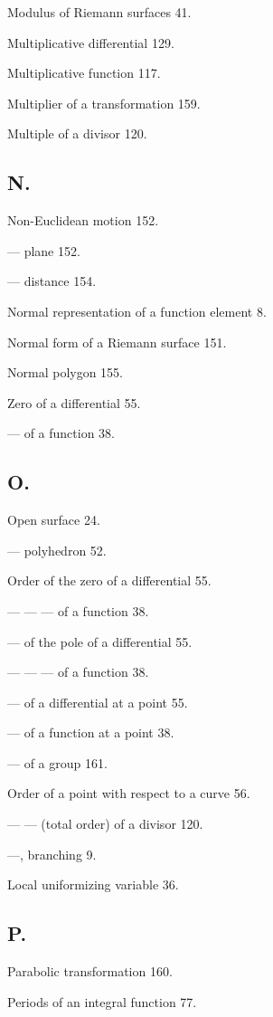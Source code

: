 \documentclass{article}
\begin{document}
Modulus of Riemann surfaces 41.

Multiplicative differential 129.

Multiplicative function 117.

Multiplier of a transformation 159.

Multiple of a divisor 120.

\subsection*{N.}

Non-Euclidean motion 152.

--- plane 152.

--- distance 154.

Normal representation of a function element 8.

Normal form of a Riemann surface 151.

Normal polygon 155.

Zero of a differential 55.

--- of a function 38.

\subsection*{O.}

Open surface 24.

--- polyhedron 52.

Order of the zero of a differential 55.

--- --- --- of a function 38.

--- of the pole of a differential 55.

--- --- --- of a function 38.

--- of a differential at a point 55.

--- of a function at a point 38.

--- of a group 161.

Order of a point with respect to a curve 56.

--- --- (total order) of a divisor 120.

---, branching 9.

Local uniformizing variable 36.

\subsection*{P.}

Parabolic transformation 160.

Periods of an integral function 77.
\end{document}

